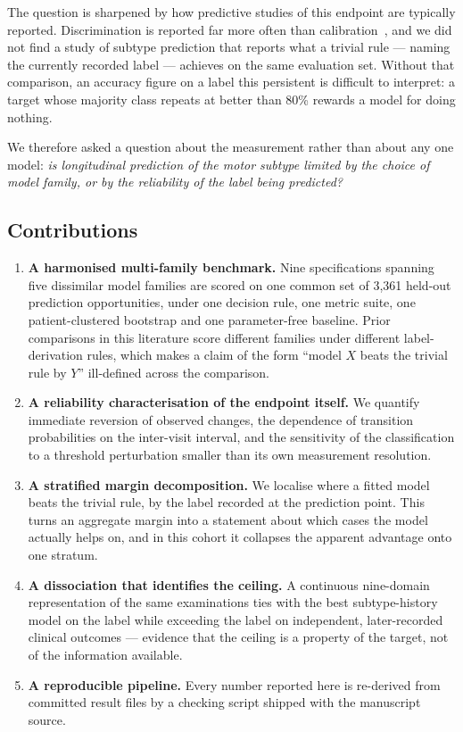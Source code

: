 \documentclass[journal]{IEEEtran}
\begin{document}
The question is sharpened by how predictive studies of this endpoint are
typically reported. Discrimination is reported far more often than
calibration~\cite{vancalster2019}, and we did not find a study of subtype
prediction that reports what a trivial rule --- naming the currently recorded
label --- achieves on the same evaluation set. Without that comparison, an
accuracy figure on a label this persistent is difficult to interpret: a target
whose majority class repeats at better than 80\% rewards a model for doing
nothing.

We therefore asked a question about the measurement rather than about any one
model: \emph{is longitudinal prediction of the motor subtype limited by the
choice of model family, or by the reliability of the label being predicted?}

\subsection{Contributions}

\begin{enumerate}
\item \textbf{A harmonised multi-family benchmark.} Nine specifications spanning
five dissimilar model families are scored on one common set of 3,361 held-out
prediction opportunities, under one decision rule, one metric suite, one
patient-clustered bootstrap and one parameter-free baseline. Prior comparisons
in this literature score different families under different label-derivation
rules, which makes a claim of the form ``model $X$ beats the trivial rule by
$Y$'' ill-defined across the comparison.

\item \textbf{A reliability characterisation of the endpoint itself.} We
quantify immediate reversion of observed changes, the dependence of transition
probabilities on the inter-visit interval, and the sensitivity of the
classification to a threshold perturbation smaller than its own measurement
resolution.

\item \textbf{A stratified margin decomposition.} We localise where a fitted
model beats the trivial rule, by the label recorded at the prediction point.
This turns an aggregate margin into a statement about which cases the model
actually helps on, and in this cohort it collapses the apparent advantage onto
one stratum.

\item \textbf{A dissociation that identifies the ceiling.} A continuous
nine-domain representation of the same examinations ties with the best
subtype-history model on the label while exceeding the label on independent,
later-recorded clinical outcomes --- evidence that the ceiling is a property of
the target, not of the information available.

\item \textbf{A reproducible pipeline.} Every number reported here is re-derived
from committed result files by a checking script shipped with the manuscript
source.
\end{enumerate}
\end{document}
